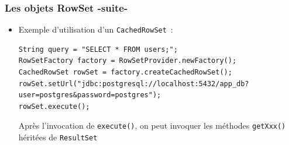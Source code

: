 \documentclass[aspectratio=169,10pt]{beamer}
\begin{document}
\begin{frame}[fragile]
\frametitle{Les objets RowSet -suite-}
\begin{itemize}
\item Exemple d'utilisation d'un \texttt{CachedRowSet}~:
\begin{lstlisting}[basicstyle=\lstcode\scriptsize]
String query = "SELECT * FROM users;";
RowSetFactory factory = RowSetProvider.newFactory();
CachedRowSet rowSet = factory.createCachedRowSet();
rowSet.setUrl("jdbc:postgresql://localhost:5432/app_db?user=postgres&password=postgres");
rowSet.execute();
\end{lstlisting}
Après l'invocation de \texttt{execute()}, on peut invoquer les méthodes \texttt{getXxx()} héritées de \texttt{ResultSet}
\end{itemize}
\end{frame}
\end{document}
